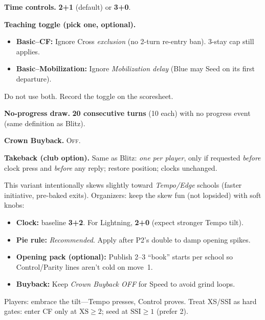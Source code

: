 \documentclass[11pt]{article}
\begin{document}
\bigskip
\begin{rulevariant}[title={Lightning Canray (Bullet)}]
\small
\textbf{Time controls.} \textbf{2+1} (default) or \textbf{3+0}.

\textbf{Teaching toggle (pick one, optional).}
\begin{itemize}\itemsep=0.2em
  \item \textbf{Basic–CF:} Ignore Cross \emph{exclusion} (no 2-turn re-entry ban). 3-stay cap still applies.
  \item \textbf{Basic–Mobilization:} Ignore \emph{Mobilization delay} (Blue may Seed on its first departure).
\end{itemize}
Do not use both. Record the toggle on the scoresheet.

\textbf{No-progress draw.} \textbf{20 consecutive turns} (10 each) with no progress event (same definition as Blitz).

\textbf{Crown Buyback.} \textsc{Off}.

\textbf{Takeback (club option).} Same as Blitz: \emph{one per player}, only if requested \emph{before} clock press and \emph{before} any reply; restore position; clocks unchanged.
\end{rulevariant}

\bigskip

\begin{rulevariant}[title={Speed Canray — Meta Note}]
This variant intentionally skews slightly toward \emph{Tempo/Edge} schools (faster initiative, pre-baked exits).
Organizers: keep the skew fun (not lopsided) with soft knobs:
\begin{itemize}\itemsep0.2em
  \item \textbf{Clock:} baseline \textbf{3+2}. For Lightning, \textbf{2+0} (expect stronger Tempo tilt).
  \item \textbf{Pie rule:} \emph{Recommended}. Apply after P2’s double to damp opening spikes.
  \item \textbf{Opening pack (optional):} Publish 2–3 “book” starts per school so Control/Parity lines aren’t cold on move~1.
  \item \textbf{Buyback:} Keep \emph{Crown Buyback OFF} for Speed to avoid grind loops.
\end{itemize}
Players: embrace the tilt—Tempo presses, Control proves. Treat XS/SSI as hard gates: enter CF only at \(\mathrm{XS}\ge2\); seed at \(\mathrm{SSI}\ge1\) (prefer 2).
\end{rulevariant}
\end{document}

